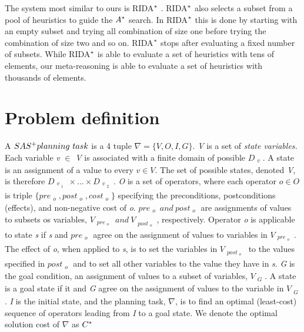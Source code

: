 The system most similar to ours is RIDA$\sp{*}$ \cite{BarleySantiagoOver}. RIDA$\sp{*}$ also selects a subset from a pool of heuristics to guide the $A\sp{*}$ search. In RIDA$\sp{*}$ this is done by starting with an empty subset and trying all combination of size one before trying the combination of size two and so on. RIDA$\sp{*}$ stops after evaluating a fixed number of subsets. While RIDA$\sp{*}$ is able to evaluate a set of heuristics with tens of elements, our meta-reasoning is able to evaluate a set of heuristics with thousands of elements.

\section{Problem definition}

A $SAS\sp{+} planning\ task$ \cite{backstrom1995complexity} is a 4 tuple $\nabla = \{V, O, I, G\}.$ \textit{V} is a set of \textit{state variables.} Each variable \textit{v} $\in$ \textit{V} is associated with a finite domain of possible $D_{\substack{v}}$. A state is an assignment of a value to every $v \in V.$ The set of possible states, denoted \textit{V}, is therefore $D_{\substack{v_{\substack{1}}}}    \times ... \times D_{\substack{v_{\substack{2}}}}$. \textit{O} is a set of operators, where each operator $o \in O$ is triple $\{pre_{\substack{o}} , post_{\substack{o}}, cost_{\substack{o}}\}$ specifying the preconditions, postconditions (effects), and non-negative cost of \textit{o}. $pre_{\substack{o}}\ and\ post_{\substack{o}}$ are assignments of values to subsets os variables, $V_{\substack{pre_{\substack{o}}}}\ and\ V_{\substack{post_{\substack{o}}}}$, respectively. Operator \textit{o} is applicable to state \textit{s} if \textit{s} and $pre_{\substack{o}}$ agree on the assignment of values to variables in $V_{\substack{pre_{\substack{o}}}}$. The effect of \textit{o}, when applied to \textit{s}, is to set the variables in $V_{\substack{post_{\substack{o}}}}$ to the values specified in $post_{\substack{o}}$ and to set all other variables to the value they have in \textit{s}. \textit{G} is the goal condition, an assignment of values to a subset of variables, $V_{\substack{G}}$. A state is a goal state if it and \textit{G} agree on the assignment of values to the variable in $V_{\substack{G}}$. \textit{I} is the initial state, and the planning task, $\nabla$, is to find an optimal (least-cost) sequence of operators leading from \textit{I} to a goal state. We denote the optimal solution cost of $\nabla$ as $C\sp{*}$ \\

